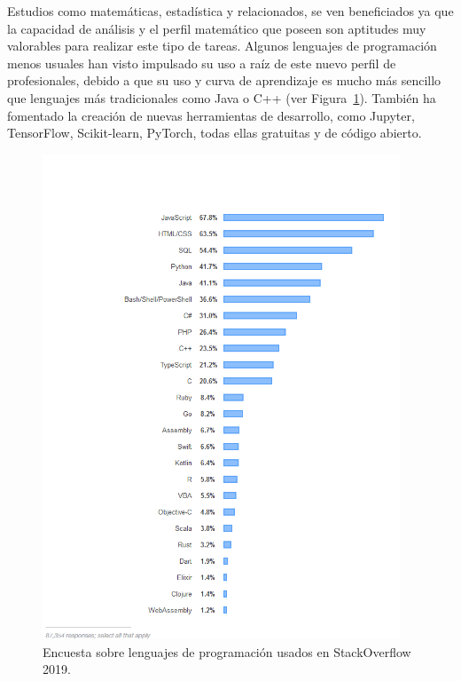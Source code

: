 Estudios como matemáticas, estadística y relacionados,
se ven beneficiados ya que la capacidad de análisis y el perfil matemático que poseen son aptitudes muy valorables para realizar este tipo de tareas.
Algunos lenguajes de programación menos usuales han visto impulsado su uso a raíz de este nuevo perfil de profesionales, debido a que su uso y curva de aprendizaje es mucho más sencillo que lenguajes más tradicionales como Java o C++ (ver Figura~\ref{fig:Encuesta sobre lenguajes de programación en StackOverflow 2019}).
También ha fomentado la creación de nuevas herramientas de desarrollo, como Jupyter, TensorFlow, Scikit-learn, PyTorch, todas ellas gratuitas y de código abierto.

\begin{figure}
    \centering
    \includegraphics[width=0.95\textwidth]{images/chapter1/stackoverflow_language.png}
    \caption{Encuesta sobre lenguajes de programación usados en StackOverflow 2019.}
    \label{fig:Encuesta sobre lenguajes de programación en StackOverflow 2019}
\end{figure}

